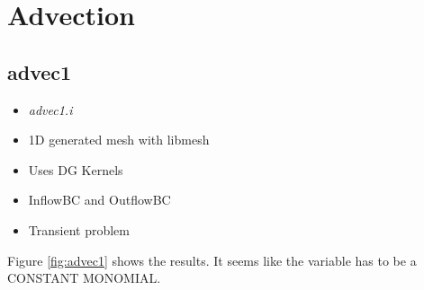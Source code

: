 \documentclass[11pt,letterpaper]{article}
\begin{document}
\section{Advection}

	\subsection{advec1}

	\begin{itemize}
		\item \textit{advec1.i}
		\item 1D generated mesh with libmesh
		\item Uses DG Kernels
		\item InflowBC and OutflowBC
		\item Transient problem
	\end{itemize}

    Figure \ref{fig:advec1} shows the results.
    It seems like the variable has to be a CONSTANT MONOMIAL.
\end{document}
